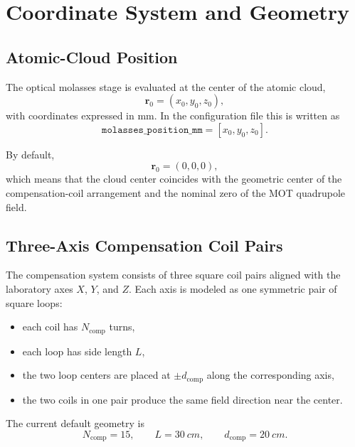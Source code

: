 \documentclass[12pt,a4paper]{article}
\begin{document}
\section{Coordinate System and Geometry}

\subsection{Atomic-Cloud Position}

The optical molasses stage is evaluated at the center of the atomic cloud,
\begin{equation}
  \bm{r}_0 = (x_0, y_0, z_0),
\end{equation}
with coordinates expressed in \si{mm}. In the configuration file this is written as
\begin{equation}
  \texttt{molasses\_position\_mm} = [x_0, y_0, z_0].
\end{equation}

By default,
\begin{equation}
  \bm{r}_0 = (0,0,0),
\end{equation}
which means that the cloud center coincides with the geometric center of the compensation-coil arrangement and the nominal zero of the MOT quadrupole field.

\subsection{Three-Axis Compensation Coil Pairs}

The compensation system consists of three square coil pairs aligned with the laboratory axes $X$, $Y$, and $Z$. Each axis is modeled as one symmetric pair of square loops:
\begin{itemize}
  \item each coil has $N_{\mathrm{comp}}$ turns,
  \item each loop has side length $L$,
  \item the two loop centers are placed at $\pm d_{\mathrm{comp}}$ along the corresponding axis,
  \item the two coils in one pair produce the same field direction near the center.
\end{itemize}

The current default geometry is
\begin{equation}
  N_{\mathrm{comp}} = 15,
  \qquad
  L = \SI{30}{cm},
  \qquad
  d_{\mathrm{comp}} = \SI{20}{cm}.
\end{equation}
\end{document}
